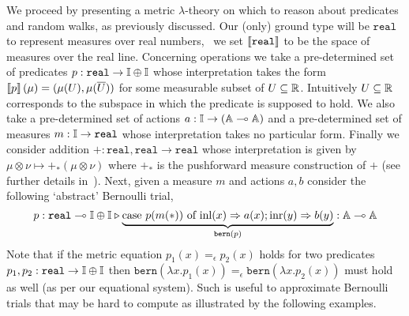 \documentclass[a4paper,UKenglish,cleveref, autoref, thm-restate]{lipics-v2021}
\begin{document}
We proceed by presenting a metric $\lambda$-theory on which to reason about
predicates and random walks, as previously discussed. Our (only) ground type
will be $\mathtt{real}$ to represent measures over real numbers, \ie\ we set
$\left \llbracket \mathtt{real} \right \rrbracket$ to be the space of measures over the real line.
Concerning operations we take a pre-determined set of predicates $p :
\mathtt{real} \to \mathbb{I} \oplus \mathbb{I}$ whose interpretation takes the form
$\left \llbracket p \right \rrbracket(\mu) = (\mu(U), \mu(\overline{U}))$ for some measurable subset of $U
\subseteq \mathbb{R}$. Intuitively $U \subseteq \mathbb{R}$ corresponds to the subspace
in which the predicate is supposed to hold. We also take a pre-determined set
of actions $a : \mathbb{I} \to (\mathbb{A} \multimap \mathbb{A})$ and a pre-determined set
of measures $m : \mathbb{I} \to \mathtt{real}$ whose interpretation takes no
particular form.  Finally we consider addition $+ : \mathtt{real},\mathtt{real}
\to \mathtt{real}$ whose interpretation is given by $\mu \otimes \nu \mapsto
+_\ast(\mu \otimes \nu)$ where $+_\ast$ is the pushforward measure construction
of $+$ (see further details in~\cite{dahlqvist22,dahlqvist2023syntactic}).
Next, given a measure $m$ and actions $a,b$ consider the following `abstract'
Bernoulli trial,
\[
        p : \mathtt{real} \multimap \mathbb{I} \oplus \mathbb{I}
        \triangleright \underbrace{ \text{case } p(m(\ast)) \text{ of } \mathrm{inl}(x) \Rightarrow a(x) ; 
        \mathrm{inr}(y) \Rightarrow b(y)}_{\mathtt{bern}(p)} : \mathbb{A} \multimap \mathbb{A}
\]
Note that if the metric equation $p_1(x) =_\epsilon p_2(x)$ holds for two
predicates $p_1, p_2 : \mathtt{real} \to \mathbb{I} \oplus \mathbb{I}$ then
$\mathtt{bern}(\lambda x. p_1(x)) =_\epsilon \mathtt{bern}(\lambda x.  p_2(x))$
must hold as well (as per our equational system). Such is useful to approximate
Bernoulli trials that may be hard to compute as illustrated by the following
examples.
\end{document}
